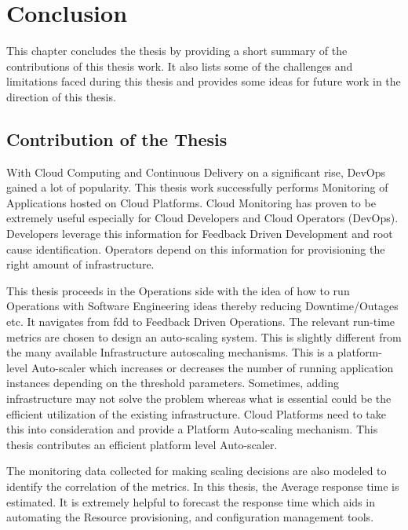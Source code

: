 \documentclass[article,type=msc,colorback,12pt,accentcolor=tud8b,table]{tudthesis}
\begin{document}
\cleardoublepage

 \hfill 
\section{Conclusion}	 
	 \hfill \break

This chapter concludes the thesis by providing a short summary of the contributions of this thesis work. It also lists some of the challenges and limitations faced during this thesis and provides some ideas for future work in the direction of this thesis.
 
\subsection{Contribution of the Thesis}

With Cloud Computing and Continuous Delivery on a significant rise, DevOps gained a lot of popularity. This thesis work successfully performs Monitoring of Applications hosted on Cloud Platforms. Cloud Monitoring has proven to be extremely useful especially for Cloud Developers and Cloud Operators (DevOps). Developers leverage this information for Feedback Driven Development and root cause identification. Operators depend on this information for provisioning the right amount of infrastructure.

This thesis proceeds in the Operations side with the idea of how to run Operations with Software Engineering ideas thereby reducing Downtime/Outages etc. It navigates from \gls{fdd} to Feedback Driven Operations. The relevant run-time metrics are chosen to design an auto-scaling system. This is slightly different from the many available Infrastructure autoscaling mechanisms. This is a platform-level Auto-scaler which increases or decreases the number of running application instances depending on the threshold parameters. Sometimes, adding infrastructure may not solve the problem whereas what is essential could be the efficient utilization of the existing infrastructure. Cloud Platforms need to take this into consideration and provide a Platform Auto-scaling mechanism. This thesis contributes an efficient platform level Auto-scaler. 

The monitoring data collected for making scaling decisions are also modeled to identify the correlation of the metrics. In this thesis, the Average response time is estimated. It is extremely helpful to forecast the response time which aids in automating the Resource provisioning, and configuration management tools. 
\end{document}

